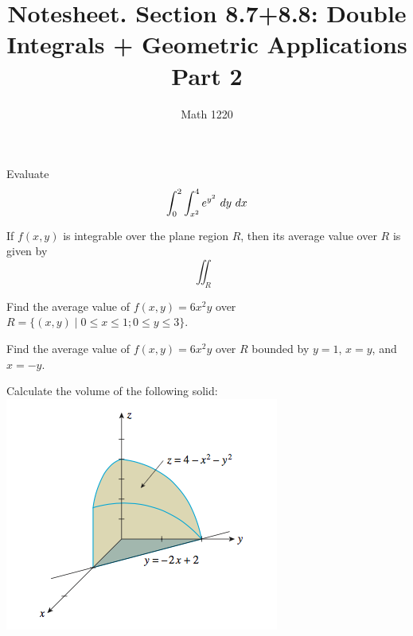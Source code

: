 \documentclass[12pt, a4paper]{article}
\author{Math 1220}
\title{Notesheet. Section 8.7+8.8: Double Integrals + Geometric
  Applications Part 2}
\date{}
\begin{document}
\maketitle
\nameline
\begin{ex}
  Evaluate \[
    \int_0^2 \int_{x^2}^4 e^{y^2}\ dy \dx
  \]
\end{ex}
\begin{thrm}
  If \(f(x,y)\) is integrable over the plane region \(R\), then its
  average value over \(R\) is given by \[
    \iint_R
  \]
\end{thrm}
\begin{ex}
  Find the average value of \(f(x,y) = 6x^2y\) over \(R = \{(x,y) \mid
  0 \leq x \leq 1; 0 \leq y \leq 3\}\). 
\end{ex}
\pagebreak
\begin{ex}
  Find the average value of \(f(x,y) = 6x^2 y\) over \(R\) bounded by
  \(y=1\), \(x=y\), and \(x=-y\).
\end{ex}
\begin{ex}
  Calculate the volume of the following solid:\\
  \includegraphics[scale=0.7]{images/solid-for-volume-calc}
\end{ex}
\end{document}
